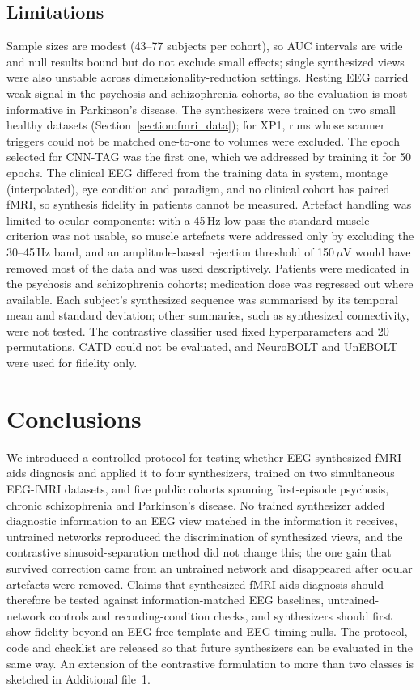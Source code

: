 \documentclass[pdflatex,referee,sn-basic]{sn-jnl}%
\begin{document}
\subsection{Limitations}\label{section:limitations}

Sample sizes are modest (43--77 subjects per cohort), so AUC intervals are wide and null results bound but do not exclude small effects; single synthesized views were also unstable across dimensionality-reduction settings. Resting EEG carried weak signal in the psychosis and schizophrenia cohorts, so the evaluation is most informative in Parkinson's disease. The synthesizers were trained on two small healthy datasets (Section~\ref{section:fmri_data}); for XP1, runs whose scanner triggers could not be matched one-to-one to volumes were excluded. The epoch selected for CNN-TAG was the first one, which we addressed by training it for 50 epochs. The clinical EEG differed from the training data in system, montage (interpolated), eye condition and paradigm, and no clinical cohort has paired fMRI, so synthesis fidelity in patients cannot be measured. Artefact handling was limited to ocular components: with a 45\,Hz low-pass the standard muscle criterion was not usable, so muscle artefacts were addressed only by excluding the 30--45\,Hz band, and an amplitude-based rejection threshold of 150\,$\mu$V would have removed most of the data and was used descriptively. Patients were medicated in the psychosis and schizophrenia cohorts; medication dose was regressed out where available. Each subject's synthesized sequence was summarised by its temporal mean and standard deviation; other summaries, such as synthesized connectivity, were not tested. The contrastive classifier used fixed hyperparameters and 20 permutations. CATD could not be evaluated, and NeuroBOLT and UnEBOLT were used for fidelity only.

\section{Conclusions}\label{section:conclusion}

We introduced a controlled protocol for testing whether EEG-synthesized fMRI aids diagnosis and applied it to four synthesizers, trained on two simultaneous EEG-fMRI datasets, and five public cohorts spanning first-episode psychosis, chronic schizophrenia and Parkinson's disease. No trained synthesizer added diagnostic information to an EEG view matched in the information it receives, untrained networks reproduced the discrimination of synthesized views, and the contrastive sinusoid-separation method did not change this; the one gain that survived correction came from an untrained network and disappeared after ocular artefacts were removed. Claims that synthesized fMRI aids diagnosis should therefore be tested against information-matched EEG baselines, untrained-network controls and recording-condition checks, and synthesizers should first show fidelity beyond an EEG-free template and EEG-timing nulls. The protocol, code and checklist are released so that future synthesizers can be evaluated in the same way. An extension of the contrastive formulation to more than two classes is sketched in Additional file~1.
\end{document}
